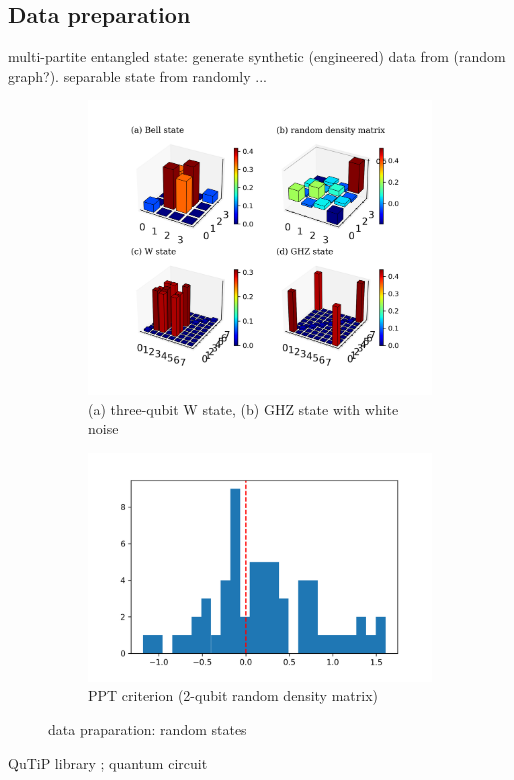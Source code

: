 \documentclass[
10pt,
aps,
pra,
linenumbers,
floatfix,
]{revtex4-2}
\theoremstyle{plain}
\theoremstyle{definition}
\begin{document}
\subsection{Data preparation}
multi-partite entangled state: generate synthetic (engineered) data from (random graph?).
separable state from randomly ...
\begin{figure}[!ht]
	\centering
	\begin{subfigure}{0.45\textwidth}
	\centering
		\includegraphics[width=.9\linewidth]{./notebook/dataset_sample.png}
		\caption{(a) three-qubit W state, (b) GHZ state with white noise}
	\end{subfigure}
	\begin{subfigure}{0.45\textwidth}
	\centering
		\includegraphics[width=.9\linewidth]{./notebook/two_qubit_PPT_hist.png}
		\caption{PPT criterion (2-qubit random density matrix)}
	\end{subfigure}
	\caption{data praparation: random states}
\end{figure}
QuTiP library \cite{johanssonQuTiPPythonFramework2013}; quantum circuit \cite{liPulselevelNoisyQuantum2022}
\end{document}
